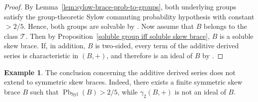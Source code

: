 \documentclass[11pt, oneside]{amsart}
\numberwithin{equation}{section}
\theoremstyle{plain}
\theoremstyle{definition}
\newtheorem{example}[equation]{Example}
\newcommand{\Pb}{\operatorname{Pb} }
\newcommand{\Syl}{\operatorname{Syl} }
\begin{document}
\begin{proof}
By Lemma~\ref{lem:sylow-brace-prob-to-groups}, both underlying groups
satisfy the group-theoretic Sylow commuting probability hypothesis with
constant $>2/5$. Hence, both groups are solvable by \cite{DLMS25}. 
Now assume that $B$ belongs to the class $\mathcal T$. Then by Proposition~\ref{soluble group iff soluble skew brace}, $B$ is a soluble skew brace. If, in addition, $B$ is two-sided, every term of the additive derived series is characteristic in $(B,+)$, and therefore is an ideal of $B$ by \cite[Lemma 4.1]{Nas19}.
\end{proof}


\begin{example} %
The conclusion concerning the additive derived series does not extend to symmetric skew braces. Indeed, there exists a finite symmetric skew brace $B$ such that $\Pb_{\Syl}(B)>2/5$, while $\gamma_2(B,+)$ is not an ideal of $B$.
\end{example}
\end{document}
